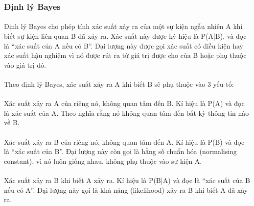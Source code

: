 \documentclass{article}
\begin{document}
\subsubsection{Định lý Bayes}
\paragraph{}Định lý Bayes cho phép tính xác suất xảy ra của một sự kiện ngẫu nhiên A khi biết sự kiện liên quan B đã xảy ra. Xác suất này được ký hiệu là P(A|B), và đọc là “xác suất của A nếu có B”. Đại lượng này được gọi xác suất có điều kiện hay xác suất hậu nghiệm vì nó được rút ra từ giá trị được cho của B hoặc phụ thuộc vào giá trị đó.
\paragraph{}Theo định lý Bayes, xác suất xảy ra A khi biết B sẽ phụ thuộc vào 3 yếu tố:
\paragraph{}Xác suất xảy ra A của riêng nó, không quan tâm đến B. Kí hiệu là P(A) và đọc là xác suất của A. Theo nghĩa rằng nó không quan tâm đến bất kỳ thông tin nào về B.
\paragraph{}Xác suất xảy ra B của riêng nó, không quan tâm đến A. Kí hiệu là P(B) và đọc là “xác suất của B”. Đại lượng này còn gọi là hằng số chuẩn hóa (normalising constant), vì nó luôn giống nhau, không phụ thuộc vào sự kiện A.
\paragraph{}Xác suất xảy ra B khi biết A xảy ra. Kí hiệu là P(B|A) và đọc là “xác suất của B nếu có A”. Đại lượng này gọi là khả năng (likelihood) xảy ra B khi biết A đã xảy ra.
\end{document}

